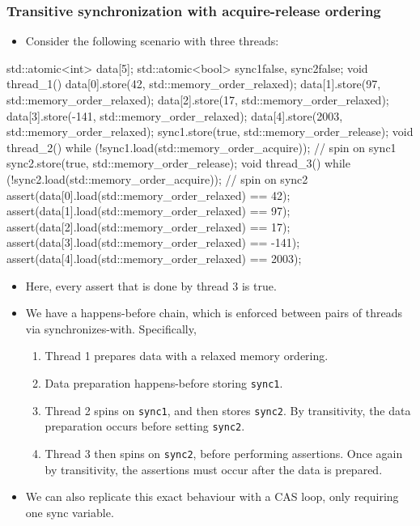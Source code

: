 \documentclass[11pt, a4paper]{article}
\theoremstyle{definition}
\theoremstyle{remark}
\newcommand{\code}[1]{\lstinline|#1|}
\begin{document}
\subsubsection{Transitive synchronization with acquire-release ordering}
\begin{itemize}
    \item Consider the following scenario with three threads:
\end{itemize}
\begin{cppcode}
std::atomic<int> data[5];
std::atomic<bool> sync1{false}, sync2{false};
void thread_1() {
    data[0].store(42, std::memory_order_relaxed);
    data[1].store(97, std::memory_order_relaxed);
    data[2].store(17, std::memory_order_relaxed);
    data[3].store(-141, std::memory_order_relaxed);
    data[4].store(2003, std::memory_order_relaxed);
    sync1.store(true, std::memory_order_release);
}
void thread_2() {
    while (!sync1.load(std::memory_order_acquire)); // spin on sync1
    sync2.store(true, std::memory_order_release);
}
void thread_3() {
    while (!sync2.load(std::memory_order_acquire)); // spin on sync2
    assert(data[0].load(std::memory_order_relaxed) == 42);
    assert(data[1].load(std::memory_order_relaxed) == 97);
    assert(data[2].load(std::memory_order_relaxed) == 17);
    assert(data[3].load(std::memory_order_relaxed) == -141);
    assert(data[4].load(std::memory_order_relaxed) == 2003);
}
\end{cppcode}
\begin{itemize}
    \item Here, every assert that is done by thread 3 is true. 
    \item We have a happens-before chain, which is enforced between pairs of threads via synchronizes-with. Specifically,
    \begin{enumerate}
        \item Thread 1 prepares data with a relaxed memory ordering.
        \item Data preparation happens-before storing \code{sync1}.
        \item Thread 2 spins on \code{sync1}, and then stores \code{sync2}. By transitivity, the data preparation occurs before setting \code{sync2}.
        \item Thread 3 then spins on \code{sync2}, before performing assertions. Once again by transitivity, the assertions must occur after the data is prepared.
    \end{enumerate}
    \item We can also replicate this exact behaviour with a CAS loop, only requiring one sync variable.
\end{itemize}
\end{document}
